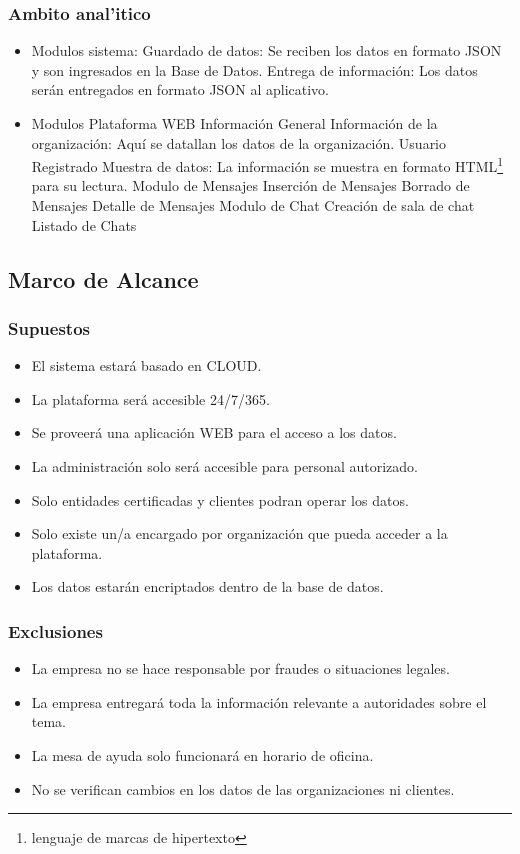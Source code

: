 \documentclass[letterpaper,openright,10pt,twoside]{report}
\begin{document}
					\subsubsection{Ambito anal'itico}
						\begin{itemize}
							\item Modulos sistema:
								\subitem Guardado de datos: Se reciben los datos en formato JSON y son ingresados en la Base de Datos.
								\subitem Entrega de información: Los datos serán entregados en formato JSON al aplicativo.
							\item Modulos Plataforma WEB
								\subitem Información General
									\subsubitem Información de la organización: Aquí se datallan los datos de la organización.
								\subitem Usuario Registrado
									\subsubitem Muestra de datos: La información se muestra en formato HTML\footnote{lenguaje de marcas de hipertexto} para su lectura.
								\subitem Modulo de Mensajes
									\subsubitem Inserción de Mensajes
									\subsubitem Borrado de Mensajes
									\subsubitem Detalle de Mensajes
								\subitem Modulo de Chat
									\subsubitem Creación de sala de chat
									\subsubitem Listado de Chats
						\end{itemize}
				\subsection{Marco de Alcance}	
						\subsubsection{Supuestos}
							\begin{itemize}
								\item El sistema estará basado en CLOUD.
								\item La plataforma será accesible 24/7/365.
								\item Se proveerá una aplicación WEB para el acceso a los datos.
								\item La administración solo será accesible para personal autorizado.
								\item Solo entidades certificadas y clientes podran operar los datos.
								\item Solo existe un/a encargado por organización que pueda acceder a la plataforma.
								\item Los datos estarán encriptados dentro de la base de datos.
							\end{itemize}
						\subsubsection{Exclusiones}
							\begin{itemize}
								\item La empresa no se hace responsable por fraudes o situaciones legales.
								\item La empresa entregará toda la información relevante a autoridades sobre el tema.
								\item La mesa de ayuda solo funcionará en horario de oficina.
								\item No se verifican cambios en los datos de las organizaciones ni clientes.
							\end{itemize}
\end{document}
